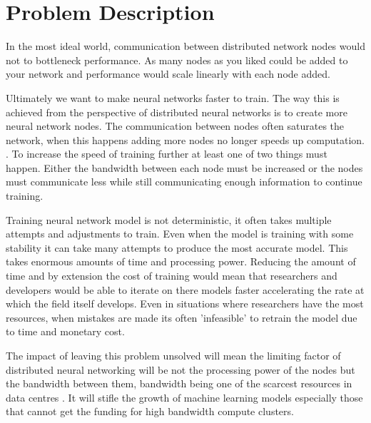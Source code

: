 \clearpage
\section{Problem Description}

In the most ideal world, communication between distributed network nodes would
not to bottleneck performance. As many nodes as you liked could be added to your
network and performance would scale linearly with each node added.



Ultimately we want to make neural networks faster to train. The way this is
achieved from the perspective of distributed neural networks is to create more
neural network nodes. The communication between nodes often saturates the
network, when this happens adding more nodes no longer speeds up computation.
\cite{li2014communication}. To increase the speed of training further at least
one of two things must happen. Either the bandwidth between each node must be
increased or the nodes must communicate less while still communicating enough
information to continue training.
\par
Training neural network model is not deterministic, it often takes multiple
attempts and adjustments to train. Even when the model is training with some
stability it can take many attempts to produce the most accurate model. This
takes enormous amounts of time and processing power. Reducing the amount of time
and by extension the cost of training would mean that researchers and developers
would be able to iterate on there models faster accelerating the rate at which
the field itself develops. Even in situations where researchers have the most
resources, when mistakes are made its often 'infeasible' to retrain the model
due to time and monetary cost. \cite{fewshowlearners2020gpt}
\par
The impact of leaving this problem unsolved will mean the limiting factor of
distributed neural networking will be not the processing power of the nodes but
the bandwidth between them, bandwidth being one of the scarcest resources in
data centres \cite{LuizDatacenterAsAComputer}. It will stifle the growth of
machine learning models especially those that cannot get the funding for high
bandwidth compute clusters.

